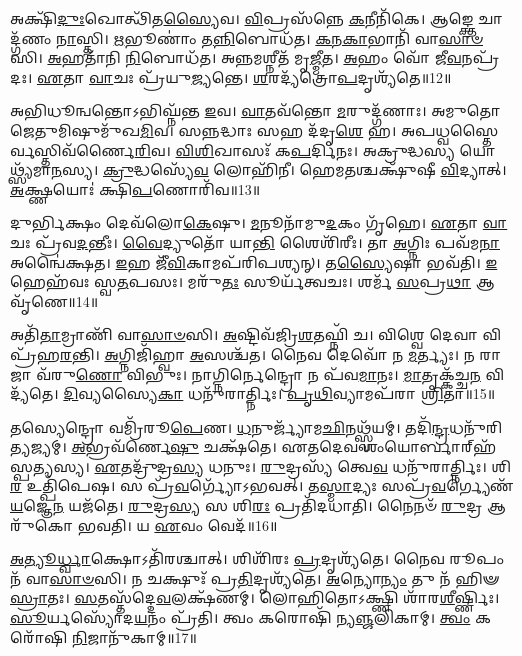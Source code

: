 𑌅𑌕𑍍𑌷𑌿᳴\-\ul{𑌦𑍁𑌃}\-𑌖𑍋𑌤𑍍𑌥𑌿᳴𑌤\-\ul{𑌸𑍍𑌯𑍈}\-𑌵। \ul{𑌵𑌿}\-𑌪𑍍𑌰𑌸᳴𑌨𑍍𑌨𑍇 \ul{𑌕}\-𑌨𑍀𑌨𑌿᳴𑌕𑍇। 
𑌆𑌙𑍍𑌕𑍍𑌤𑍇 𑌚𑌾𑌦𑍍𑌗᳴𑌣𑌂 \ul{𑌨𑌾}\-𑌸𑍍𑌤𑌿। \ul{𑌋}\-𑌭𑍂𑌣𑌾𑌂॑ 𑌤\-\ul{𑌨𑍍𑌨𑌿}\-𑌬𑍋𑌧᳴𑌤। 
\-\ul{𑌕}\-\-\ul{𑌨}\-\-\ul{𑌕𑌾}\-𑌭𑌾𑌨𑌿᳴ 𑌵𑌾\-\ul{𑌸𑌾}\-\-\ul{𑍞}\-𑌸𑌿। \ul{𑌅}\-𑌹𑌤𑌾᳴𑌨𑌿 \ul{𑌨𑌿}\-𑌬𑍋𑌧᳴𑌤। 
𑌅𑌨𑍍𑌨𑌮𑌶𑍍𑌨𑍀𑌤᳴ 𑌮𑍃\-\ul{𑌜𑍍𑌮𑍀}\-𑌤। \ul{𑌅}\-𑌹𑌂 𑌵𑍋᳴ 𑌜𑍀\-\ul{𑌵}\-𑌨𑌪𑍍𑌰᳴𑌦𑌃। 
\-\ul{𑌏}\-𑌤𑌾 \ul{𑌵𑌾}\-𑌚𑌃 𑌪𑍍𑌰᳴𑌯𑍁\-\ul{𑌜𑍍𑌯}\-𑌨𑍍𑌤𑍇। \ul{𑌶}\-𑌰𑌦𑍍𑌯᳴𑌤𑍍𑌰𑍋\-\ul{𑌪}\-𑌦𑍃𑌶𑍍𑌯᳴𑌤𑍇॥12॥

𑌅𑌭𑌿𑌧𑍂𑌨𑍍𑌵𑌨𑍍𑌤𑍋𑌽𑌭𑌿𑌘𑍍𑌨᳴𑌨𑍍𑌤 \ul{𑌇}\-𑌵। \ul{𑌵𑌾}\-𑌤𑌵᳴𑌨𑍍𑌤𑍋 \ul{𑌮}\-𑌰𑍁𑌦𑍍𑌗᳴𑌣𑌾𑌃। 
𑌅𑌮𑍁𑌤𑍋 𑌜𑍇𑌤𑍁𑌮𑌿𑌷𑍁𑌮𑍁᳴𑌖\-\ul{𑌮𑌿}\-𑌵। 𑌸𑌨𑍍𑌨𑌦𑍍𑌧𑌾𑌃 𑌸𑌹 𑌦᳴𑌦𑍃\-\ul{𑌶𑍇} 𑌹। 
𑌅𑌪𑌧𑍍𑌵𑌸𑍍𑌤𑍈𑌰𑍍𑌵𑌸𑍍𑌤𑌿𑌵᳴𑌰𑍍𑌣𑍈\-\ul{𑌰𑌿}\-𑌵। \ul{𑌵𑌿}\-\-\ul{𑌶𑌿}\-𑌖𑌾𑌸𑌃᳴ 𑌕\-\ul{𑌪}\-𑌰𑍍𑌦𑌿𑌨𑌃। 
𑌅𑌕𑍍𑌰𑍁𑌦𑍍𑌧𑌸𑍍𑌯 𑌯𑍋𑌥𑍍𑌸𑍍𑌯᳴𑌮𑌾\-\ul{𑌨}\-𑌸𑍍𑌯। \ul{𑌕𑍍𑌰𑍁}\-𑌦𑍍𑌧𑌸𑍍𑌯𑍇᳴\-\ul{𑌵} 𑌲𑍋𑌹𑌿᳴𑌨𑍀। 
𑌹𑍇𑌮𑌤𑌶𑍍𑌚𑌕𑍍𑌷𑍁᳴𑌷𑍀 \ul{𑌵𑌿}\-𑌦𑍍𑌯𑌾𑌤𑍍। \ul{𑌅}\-𑌕𑍍𑌷𑍍𑌣𑌯𑍋𑌃॑ 𑌕𑍍𑌷𑌿\-\ul{𑌪}\-𑌣𑍋𑌰𑌿᳴𑌵॥13॥

𑌦𑍁𑌰𑍍𑌭𑌿𑌕𑍍𑌷𑌂 𑌦𑍇𑌵᳴𑌲𑍋\-\ul{𑌕𑍇}\-𑌷𑍁। \ul{𑌮}\-𑌨𑍂𑌨𑌾᳴𑌮𑍁\-\ul{𑌦}\-𑌕𑌂 𑌗𑍃᳴𑌹𑍇। 
\-\ul{𑌏}\-𑌤𑌾 \ul{𑌵𑌾}\-𑌚𑌃 𑌪𑍍𑌰᳴𑌵\-\ul{𑌦}\-𑌨𑍍𑌤𑍀𑌃। \ul{𑌵𑍈}\-𑌦𑍍𑌯𑍁𑌤𑍋᳴ 𑌯𑌾\-\ul{𑌨𑍍𑌤𑌿} 𑌶𑍈𑌶𑌿᳴𑌰𑍀𑌃। 
𑌤𑌾 \ul{𑌅}\-𑌗𑍍𑌨𑌿𑌃 𑌪𑌵᳴𑌮\-\ul{𑌨𑌾} 𑌅𑌨𑍍𑌵𑍈॑𑌕𑍍𑌷𑌤। \ul{𑌇}\-𑌹 𑌜𑍀᳴\-\ul{𑌵𑌿}\-𑌕𑌾𑌮𑌪᳴𑌰𑌿𑌪𑌶𑍍𑌯𑌨𑍍। 
𑌤\-\ul{𑌸𑍍𑌯𑍈}\-𑌷𑌾 𑌭𑌵᳴𑌤𑌿। \ul{𑌇}\-𑌹𑍇𑌹᳴𑌵𑌃 𑌸𑍍𑌵\-\ul{𑌤}\-𑌪𑌸𑌃। 
𑌮𑌰𑍁᳴\-\ul{𑌤𑌃} 𑌸𑍂𑌰𑍍𑌯᳴𑌤𑍍𑌵𑌚𑌃। 𑌶𑌰𑍍𑌮᳴ \ul{𑌸}\-𑌪𑍍𑌰\-\ul{𑌥𑌾} 𑌆𑌵𑍃᳴𑌣𑍇॥14॥\anuvakamend


𑌅𑌤𑌿᳴\-\ul{𑌤𑌾}\-𑌮𑍍𑌰𑌾𑌣𑌿᳴ 𑌵𑌾\-\ul{𑌸𑌾}\-\-\ul{𑍞}\-𑌸𑌿। \ul{𑌅}\-𑌷𑍍𑌟𑌿𑌵᳴𑌜𑍍𑌰𑌿\-\ul{𑌶}\-𑌤𑌘𑍍𑌨𑌿᳴ 𑌚। 
𑌵𑌿𑌶𑍍𑌵𑍇 𑌦𑍇𑌵𑌾 𑌵𑌿𑌪𑍍𑌰᳴𑌹\-\ul{𑌰}\-𑌨𑍍𑌤𑌿। \ul{𑌅}\-𑌗𑍍𑌨𑌿𑌜𑌿᳴𑌹𑍍𑌵𑌾 \ul{𑌅}\-𑌸𑌶𑍍𑌚᳴𑌤। 
𑌨𑍈𑌵 𑌦𑍇𑌵𑍋᳴ 𑌨 \ul{𑌮}\-𑌰𑍍𑌤𑍍𑌯𑌃। 𑌨 𑌰𑌾𑌜𑌾 𑌵᳴𑌰𑍁\-\ul{𑌣𑍋} 𑌵𑌿𑌭𑍁𑌃। 
𑌨𑌾𑌗𑍍𑌨𑌿𑌰𑍍𑌨𑍇𑌨𑍍𑌦𑍍𑌰𑍋 𑌨 𑌪᳴𑌵\-\ul{𑌮𑌾}\-𑌨𑌃। \ul{𑌮𑌾}\-𑌤𑍃𑌕𑍍𑌕᳴𑌚𑍍𑌚\-\ul{𑌨} 𑌵𑌿𑌦𑍍𑌯᳴𑌤𑍇। 
\-\ul{𑌦𑌿}\-𑌵𑍍𑌯𑌸𑍍𑌯𑍈\-\ul{𑌕𑌾} 𑌧𑌨𑍁᳴𑌰𑌾𑌰𑍍𑌤𑍍𑌨𑌿𑌃। \ul{𑌪𑍃}\-\-\ul{𑌥𑌿}\-𑌵𑍍𑌯𑌾𑌮𑌪᳴𑌰𑌾 \ul{𑌶𑍍𑌰𑌿}\-𑌤𑌾॥15॥

𑌤𑌸𑍍𑌯𑍇𑌨𑍍𑌦𑍍𑌰𑍋 𑌵𑌮𑍍𑌰𑌿᳴𑌰𑍂\-\ul{𑌪𑍇}\-𑌣। \ul{𑌧}\-𑌨𑍁𑌰𑍍𑌜𑍍𑌯𑌾᳴𑌮\-\ul{𑌛𑌿}\-𑌨𑌥𑍍𑌸𑍍𑌵᳴𑌯𑌮𑍍। 
𑌤𑌦𑌿᳴\-\ul{𑌨𑍍𑌦𑍍𑌰}\-𑌧𑌨𑍁᳴\-𑌰𑌿\-\ul{𑌤𑍍𑌯}\-𑌜𑍍𑌯𑌮𑍍। \ul{𑌅}\-𑌭𑍍𑌰𑌵᳴𑌰𑍍𑌣𑍇\-\ul{𑌷𑍁} 𑌚𑌕𑍍𑌷᳴𑌤𑍇। 
𑌏𑌤𑌦𑍇𑌵 𑌶𑌂𑌯𑍋𑌰𑍍𑌬𑌾𑌰𑍍‌𑌹᳴𑌸𑍍𑌪\-\ul{𑌤𑍍𑌯}\-𑌸𑍍𑌯। \ul{𑌏}\-𑌤𑌦𑍍𑌰𑍁᳴𑌦𑍍𑌰\-\ul{𑌸𑍍𑌯} 𑌧𑌨𑍁𑌃। 
\-\ul{𑌰𑍁}\-𑌦𑍍𑌰𑌸𑍍𑌯᳴ 𑌤𑍍𑌵𑍇\-\ul{𑌵} 𑌧𑌨𑍁᳴𑌰𑌾𑌰𑍍𑌤𑍍𑌨𑌿𑌃। 𑌶𑌿\-\ul{𑌰} 𑌉𑌤𑍍𑌪𑌿᳴𑌪𑍇𑌷। 
𑌸 𑌪𑍍𑌰᳴\-\ul{𑌵}\-𑌰𑍍𑌗𑍍𑌯𑍋᳴𑌽𑌭𑌵𑌤𑍍। 𑌤\-\ul{𑌸𑍍𑌮𑌾}\-𑌦𑍍𑌯𑌃 𑌸𑌪𑍍𑌰᳴\-\ul{𑌵}\-𑌰𑍍𑌗𑍍𑌯𑍇𑌣᳴ \ul{𑌯}\-𑌜𑍍𑌞𑍇\-\ul{𑌨} 𑌯𑌜᳴𑌤𑍇। 
\-\ul{𑌰𑍁}\-𑌦𑍍𑌰\-\ul{𑌸𑍍𑌯} 𑌸 𑌶𑌿\-\ul{𑌰𑌃} 𑌪𑍍𑌰𑌤𑌿᳴𑌦𑌧𑌾𑌤𑌿। 𑌨𑍈𑌨𑍞᳴ \ul{𑌰𑍁}\-𑌦𑍍𑌰 𑌆𑌰𑍁᳴𑌕𑍋 𑌭𑌵𑌤𑌿। 𑌯 \ul{𑌏}\-𑌵𑌂 𑌵𑍇𑌦᳴॥16॥\anuvakamend


\-\ul{𑌅}\-\-\ul{𑌤𑍍𑌯𑍂}\-\-\ul{𑌰𑍍𑌧𑍍𑌵𑌾}\-𑌕𑍍𑌷𑍋𑌽𑌤𑌿᳴𑌰𑌶𑍍𑌚𑌾𑌤𑍍। 𑌶𑌿𑌶𑌿᳴𑌰𑌃 \ul{𑌪𑍍𑌰}\-𑌦𑍃𑌶𑍍𑌯᳴𑌤𑍇। 
𑌨𑍈𑌵 𑌰𑍂𑌪𑌂 𑌨᳴ 𑌵𑌾\-\ul{𑌸𑌾}\-\-\ul{𑍞}\-𑌸𑌿। 𑌨 𑌚𑌕𑍍𑌷𑍁𑌃᳴ 𑌪𑍍𑌰\-\ul{𑌤𑌿}\-𑌦𑍃𑌶𑍍𑌯᳴𑌤𑍇। 
\-\ul{𑌅}\-𑌨𑍍𑌯𑍋\-\ul{𑌨𑍍𑌯𑌂} 𑌤𑍁 𑌨᳴ 𑌹𑌿𑍟\-\ul{𑌸𑍍𑌰𑌾}\-𑌤𑌃। \ul{𑌸}\-𑌤𑌸𑍍𑌤᳴𑌦𑍍𑌦𑍇\-\ul{𑌵}\-𑌲𑌕𑍍𑌷᳴𑌣𑌮𑍍। 
𑌲𑍋𑌹𑌿𑌤𑍋𑌽𑌕𑍍𑌷𑍍𑌣𑌿 𑌶𑌾᳴𑌰\-\ul{𑌶𑍀}\-𑌰𑍍𑌷𑍍𑌣𑌿𑌃। \ul{𑌸𑍂}\-𑌰𑍍𑌯𑌸𑍍𑌯𑍋᳴𑌦\-\ul{𑌯}\-𑌨𑌂 𑌪𑍍𑌰᳴𑌤𑌿। 
𑌤𑍍𑌵𑌂 𑌕𑌰𑍋𑌷𑌿᳴ 𑌨𑍍𑌯\-\ul{𑌞𑍍𑌜}\-𑌲𑌿𑌕𑌾𑌮𑍍। \ul{𑌤𑍍𑌵𑌂} 𑌕𑌰𑍋᳴𑌷𑌿 \ul{𑌨𑌿}\-𑌜𑌾𑌨𑍁᳴𑌕𑌾𑌮𑍍॥17॥

